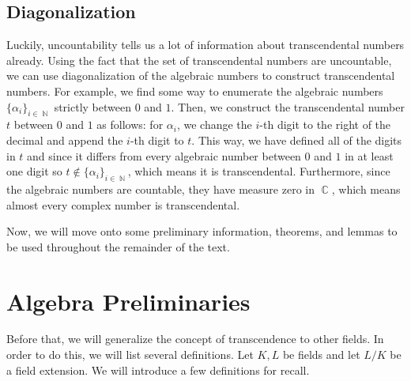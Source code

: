 \documentclass[a4paper, 11pt]{book}
\DeclareMathOperator{\C}{\mathbb{C}}
\DeclareMathOperator{\N}{\mathbb{N}}
\begin{document}
\subsection{Diagonalization}
Luckily, uncountability tells us a lot of information about transcendental numbers already. Using the fact that the set of transcendental numbers are uncountable, we can use diagonalization of the algebraic numbers to construct transcendental numbers. For example, we find some way to enumerate the algebraic numbers ${\{\alpha_{i}\}}_{i \in \N}$ strictly between $0$ and $1$. Then, we construct the transcendental number $t$ between $0$ and $1$ as follows: for $\alpha_i$, we change the $i$-th digit to the right of the decimal and append the $i$-th digit to $t$. This way, we have defined all of the digits in $t$ and since it differs from every algebraic number between $0$ and $1$ in at least one digit so $t \notin {\{\alpha_{i}\}}_{i \in \N}$, which means it is transcendental. Furthermore, since the algebraic numbers are countable, they have measure zero in $\C$, which means almost every complex number is transcendental.\par

Now, we will move onto some preliminary information, theorems, and lemmas to be used throughout the remainder of the text.

\newpage
\section{Algebra Preliminaries}

Before that, we will generalize the concept of transcendence to other fields. In order to do this, we will list several definitions. Let $K, L$ be fields and let $L/K$ be a field extension. We will introduce a few definitions for recall.\par
\end{document}
